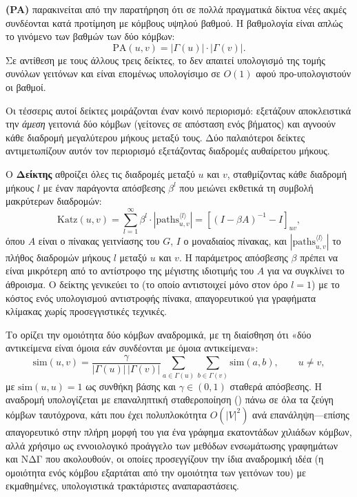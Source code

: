 \textbf{ (PA)} \cite{barabasi1999emergence}
παρακινείται από την παρατήρηση ότι σε πολλά πραγματικά δίκτυα νέες ακμές
συνδέονται κατά προτίμηση με κόμβους υψηλού βαθμού.
Η βαθμολογία είναι απλώς το
γινόμενο των βαθμών των δύο κόμβων:
\begin{equation}
    \mathrm{PA}(u, v) = |\Gamma(u)| \cdot |\Gamma(v)|.
    \label{eq:pa}
\end{equation}
Σε αντίθεση με τους άλλους τρεις δείκτες, το  δεν απαιτεί υπολογισμό της τομής
συνόλων γειτόνων και είναι επομένως υπολογίσιμο σε $O(1)$ αφού προ-υπολογιστούν οι
βαθμοί.

Οι τέσσερις αυτοί δείκτες μοιράζονται έναν κοινό περιορισμό: εξετάζουν αποκλειστικά
την \textit{άμεση} γειτονιά δύο κόμβων (γείτονες σε απόσταση ενός βήματος) και
αγνοούν κάθε διαδρομή μεγαλύτερου μήκους μεταξύ τους.
Δύο παλαιότεροι δείκτες
αντιμετωπίζουν αυτόν τον περιορισμό εξετάζοντας διαδρομές αυθαίρετου μήκους.

Ο \textbf{Δείκτης } \cite{katz1953status} αθροίζει όλες τις διαδρομές μεταξύ
$u$ και $v$, σταθμίζοντας κάθε διαδρομή μήκους $l$ με έναν παράγοντα απόσβεσης
$\beta^l$ που μειώνει εκθετικά τη συμβολή μακρύτερων διαδρομών:
\begin{equation}
    \mathrm{Katz}(u, v) = \sum_{l=1}^{\infty} \beta^l \cdot |\mathrm{paths}_{u,v}^{\langle l \rangle}|
    = \left[(I - \beta A)^{-1} - I\right]_{uv},
    \label{eq:katz}
\end{equation}
όπου $A$ είναι ο πίνακας γειτνίασης του $G$, $I$ ο μοναδιαίος πίνακας, και
$|\mathrm{paths}_{u,v}^{\langle l \rangle}|$ το πλήθος διαδρομών μήκους $l$ μεταξύ
$u$ και $v$.
Η παράμετρος απόσβεσης $\beta$ πρέπει να είναι μικρότερη από το
αντίστροφο της μέγιστης ιδιοτιμής του $A$ για να συγκλίνει το άθροισμα.
Ο δείκτης  γενικεύει το  (το οποίο αντιστοιχεί μόνο στον όρο $l=1$)
με το κόστος ενός υπολογισμού αντιστροφής πίνακα, απαγορευτικού για γραφήματα
κλίμακας  χωρίς προσεγγιστικές τεχνικές.

Το \textbf{} \cite{jehwidom2002simrank} ορίζει την ομοιότητα δύο κόμβων
αναδρομικά, με τη διαίσθηση ότι «δύο αντικείμενα είναι όμοια εάν συνδέονται με
όμοια αντικείμενα»:
\begin{equation}
    \mathrm{sim}(u, v) = \frac{\gamma}{|\Gamma(u)| \, |\Gamma(v)|} \sum_{a \in \Gamma(u)} \sum_{b \in \Gamma(v)} \mathrm{sim}(a, b), \qquad u \neq v,
    \label{eq:simrank}
\end{equation}
με $\mathrm{sim}(u, u) = 1$ ως συνθήκη βάσης και $\gamma \in (0, 1)$ σταθερά απόσβεσης.
Η αναδρομή υπολογίζεται με επαναληπτική σταθεροποίηση ()
πάνω σε όλα τα ζεύγη κόμβων ταυτόχρονα, κάτι που έχει πολυπλοκότητα $O(|V|^2)$ ανά
επανάληψη---επίσης απαγορευτικό στην πλήρη μορφή του για ένα γράφημα εκατοντάδων
χιλιάδων κόμβων, αλλά χρήσιμο ως εννοιολογικό προάγγελο των μεθόδων ενσωμάτωσης
γραφημάτων και ΝΔΓ που ακολουθούν, οι οποίες προσεγγίζουν την ίδια αναδρομική ιδέα
(η ομοιότητα ενός κόμβου εξαρτάται από την ομοιότητα των γειτόνων του) με
εκμαθημένες, υπολογιστικά τρακτάριστες αναπαραστάσεις.

